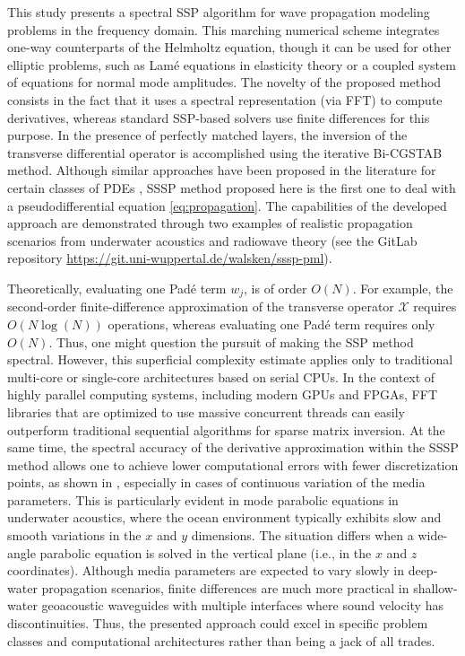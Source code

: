 \documentclass[11pt,a4paper]{article}
\theoremstyle{plain}%
\theoremstyle{definition}
\theoremstyle{remark}
\begin{document}
This study presents a spectral SSP algorithm for wave propagation modeling problems in the frequency domain. 
This marching numerical scheme integrates one-way counterparts of the Helmholtz equation, 
though it can be used for other elliptic problems, such as Lam\'e equations in elasticity theory or a coupled system of equations for normal mode amplitudes. The novelty of the proposed method consists in the fact that it uses a spectral representation (via FFT) to compute derivatives, whereas standard SSP-based solvers use finite differences for this purpose. 
In the presence of perfectly matched layers, the inversion of the transverse differential operator is accomplished using the iterative Bi-CGSTAB method. Although similar approaches have been proposed in the literature for certain classes of PDEs \cite{antoine2020pseudospectral,antoine2022pseudospectral}, SSSP method proposed here is the first one to deal with a pseudodifferential equation \eqref{eq:propagation}. The capabilities of the developed approach are demonstrated through two examples of realistic propagation scenarios from underwater acoustics and radiowave theory (see the GitLab repository \url{https://git.uni-wuppertal.de/walsken/sssp-pml}).

Theoretically, evaluating one Pad\'e term $w_j$, is of order $O(N)$. 
For example, the second-order finite-difference approximation of the transverse operator $\mathcal{X}$ requires $O(N\log(N))$ operations, 
whereas evaluating one Pad\'e term requires only $O(N)$. 
Thus, one might question the pursuit of making the SSP method spectral. 
However, this superficial complexity estimate applies only to traditional multi-core or single-core architectures based on serial CPUs. 
In the context of highly parallel computing systems, including modern GPUs and FPGAs, FFT libraries that are optimized to use massive concurrent threads can easily outperform traditional sequential algorithms for sparse matrix inversion. 
At the same time, the spectral accuracy of the derivative approximation within the SSSP method allows one to achieve lower computational errors with fewer discretization points, as shown in \cite{Daniel1}, 
especially in cases of continuous variation of the media parameters. 
This is particularly evident in mode parabolic equations in underwater acoustics, 
where the ocean environment typically exhibits slow and smooth variations in the $x$ and $y$ dimensions. 
The situation differs when a wide-angle parabolic equation is solved in the vertical plane (i.e., in the $x$ and $z$ coordinates). 
Although media parameters are expected to vary slowly in deep-water propagation scenarios, finite differences are much more practical in shallow-water geoacoustic waveguides with multiple interfaces where sound velocity has discontinuities. 
Thus, the presented approach could excel in specific problem classes and computational architectures rather than being a jack of all trades. 
\end{document}
